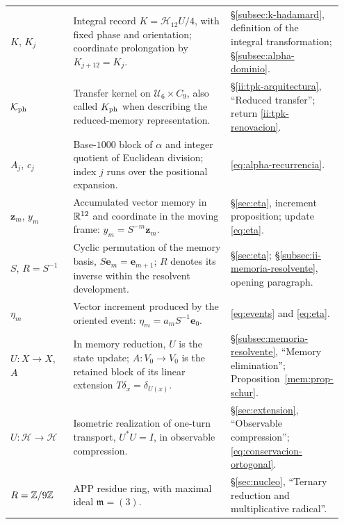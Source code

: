 \begin{longtable}{@{}>{\raggedright\arraybackslash}p{0.19\linewidth}
                    >{\raggedright\arraybackslash}p{0.49\linewidth}
                    >{\raggedright\arraybackslash}p{0.27\linewidth}@{}}
\(K\), \(K_j\)
& Integral record \(K=\mathcal H_{12}U/4\), with fixed phase and
  orientation; coordinate prolongation by \(K_{j+12}=K_j\).
& \S\ref{subsec:k-hadamard}, definition of the integral transformation;
  \S\ref{subsec:alpha-dominio}.\\[3pt]

\(\mathcal K_{\rm ph}\)
& Transfer kernel on \(\mathcal U_6\times C_9\),
  also called \(K_{\rm ph}\) when describing the reduced-memory
  representation.
& \S\ref{ii:tpk-arquitectura}, ``Reduced transfer'';
  return \eqref{ii:tpk-renovacion}.\\[3pt]

\(A_j\), \(c_j\)
& Base-\(1000\) block of \(\alpha\) and integer quotient of
  Euclidean division; index \(j\) runs over the positional expansion.
& \eqref{eq:alpha-recurrencia}.\\[3pt]

\(\mathbf z_m\), \(y_m\)
& Accumulated vector memory in \(\mathbb R^{12}\) and coordinate in the
  moving frame: \(y_m=S^{-m}\mathbf z_m\).
& \S\ref{sec:eta}, increment proposition;
  update \eqref{eq:eta}.\\[3pt]

\(S\), \(R=S^{-1}\)
& Cyclic permutation of the memory basis,
  \(S\mathbf e_m=\mathbf e_{m+1}\); \(R\) denotes its inverse
  within the resolvent development.
& \S\ref{sec:eta};
  \S\ref{subsec:ii-memoria-resolvente}, opening paragraph.\\[3pt]

\(\eta_m\)
& Vector increment produced by the oriented event:
  \(\eta_m=a_mS^{-1}\mathbf e_0\).
& \eqref{eq:events} and \eqref{eq:eta}.\\[3pt]

\(U:X\to X\), \(A\)
& In memory reduction, \(U\) is the state update;
  \(A:V_0\to V_0\) is the retained block of its linear extension
  \(T\delta_x=\delta_{U(x)}\).
& \S\ref{subsec:memoria-resolvente}, ``Memory elimination'';
  Proposition~\ref{mem:prop-schur}.\\[3pt]

\(U:\mathcal H\to\mathcal H\)
& Isometric realization of one-turn transport,
  \(U^*U=I\), in observable compression.
& \S\ref{sec:extension}, ``Observable compression'';
  \eqref{eq:conservacion-ortogonal}.\\[3pt]

\(R=\mathbb Z/9\mathbb Z\)
& APP residue ring, with maximal ideal
  \(\mathfrak m=(3)\).
& \S\ref{sec:nucleo}, ``Ternary reduction and multiplicative radical''.\\[3pt]


\end{longtable}
